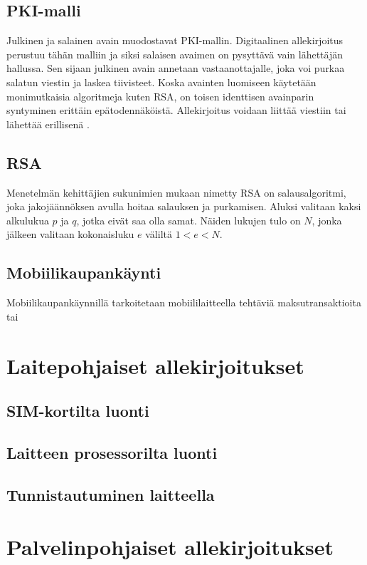 \documentclass[finnish]{tktltiki2}
\theoremstyle{definition}
\theoremstyle{remark}
\begin{document}
\subsection{PKI-malli}

Julkinen ja salainen avain muodostavat PKI-mallin. Digitaalinen allekirjoitus perustuu tähän malliin ja siksi salaisen avaimen on pysyttävä vain lähettäjän hallussa. Sen sijaan julkinen avain annetaan vastaanottajalle, joka voi purkaa salatun viestin ja laskea tiivisteet. Koska avainten luomiseen käytetään monimutkaisia algoritmeja kuten RSA, on toisen identtisen avainparin syntyminen erittäin epätodennäköistä. Allekirjoitus voidaan liittää viestiin tai lähettää erillisenä \cite{moen}.

\subsection{RSA}

Menetelmän kehittäjien sukunimien mukaan nimetty RSA on salausalgoritmi, joka jakojäännöksen avulla hoitaa salauksen ja purkamisen. Aluksi valitaan kaksi alkulukua $p$ ja $q$, jotka eivät saa olla samat. Näiden lukujen tulo on $N$, jonka jälkeen valitaan kokonaisluku $e$ väliltä $1 < e < N$.   

\subsection{Mobiilikaupankäynti}

Mobiilikaupankäynnillä tarkoitetaan mobiililaitteella tehtäviä maksutransaktioita tai 

\section{Laitepohjaiset allekirjoitukset}
\subsection{SIM-kortilta luonti}
\subsection{Laitteen prosessorilta luonti}
\subsection{Tunnistautuminen laitteella}


\section{Palvelinpohjaiset allekirjoitukset}
\end{document}
